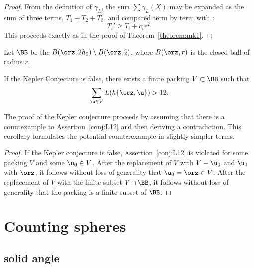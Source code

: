 \begin{proof}
From the definition of $\gamma_L$, the sum $\sum \gamma_L(X)$ may be
expanded as the sum of three terms, $T_1+T_2+T_3$, and compared term
by term with :
\begin{displaymath} 
T_i' \ge T_i + c_i r^2.
\end{displaymath}
This proceeds exactly as in the proof of Theorem~\ref{theorem:mk1}.
\end{proof}

\begin{definition}[$\BB$] 
Let $\BB$ be the
 $\bar B(\orz,2h_0)\setminus B(\orz,2)$, where
$\bar B(\orz,r)$ is the closed ball of radius $r$.
\end{definition}


\begin{corollary}\label{cor:CE} 
If the Kepler Conjecture is false,
there exists a finite packing $V\subset\BB$ such that
\begin{equation}\label{eqn:CE} 
\sum_{ \u\in V} L(h\{\orz, \u\}) > 12.
\end{equation}
\end{corollary}

The proof of the Kepler conjecture proceeds by assuming that there is
a countexample to Assertion~\ref{conj:L12} and then deriving a contradiction.
This corollary formulates the potential counterexample in slightly simpler terms.

\begin{proof} If the Kepler conjecture is false,
Assertion~\ref{conj:L12} is violated for some packing $ V$ and some
$ \u_0\in V$.  After the replacement of $ V$ with $ V - \u_0$ and $
\u_0$ with $\orz$, it follows without loss of generality that $
\u_0=\orz\in V$.  After the replacement of $ V$ with the finite
subset
$V\cap \BB$,
it follows without loss of generality that the packing is a finite subset of $\BB$.
\end{proof}



\section{Counting spheres}


\subsection{solid angle}
%
%


